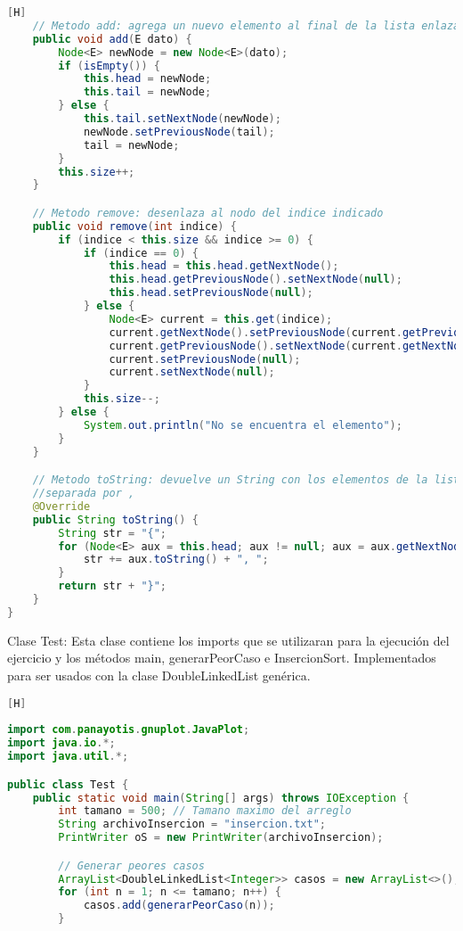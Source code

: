 \begin{enumerate}[{Ejercicio} 1.]
\begin{lstlisting}[language=java, caption={DoubleLinkedList}][H]
    // Metodo add: agrega un nuevo elemento al final de la lista enlazada
    public void add(E dato) {
        Node<E> newNode = new Node<E>(dato);
        if (isEmpty()) {
            this.head = newNode;
            this.tail = newNode;
        } else {
            this.tail.setNextNode(newNode);
            newNode.setPreviousNode(tail);
            tail = newNode;
        }
        this.size++;
    }

    // Metodo remove: desenlaza al nodo del indice indicado
    public void remove(int indice) {
        if (indice < this.size && indice >= 0) {
            if (indice == 0) {
                this.head = this.head.getNextNode();
                this.head.getPreviousNode().setNextNode(null);
                this.head.setPreviousNode(null);
            } else {
                Node<E> current = this.get(indice);
                current.getNextNode().setPreviousNode(current.getPreviousNode());
                current.getPreviousNode().setNextNode(current.getNextNode());
                current.setPreviousNode(null);
                current.setNextNode(null);
            }
            this.size--;
        } else {
            System.out.println("No se encuentra el elemento");
        }
    }

    // Metodo toString: devuelve un String con los elementos de la lista enlazada 
    //separada por ,
    @Override
    public String toString() {
        String str = "{";
        for (Node<E> aux = this.head; aux != null; aux = aux.getNextNode()) {
            str += aux.toString() + ", ";
        }
        return str + "}";
    }
}
	\end{lstlisting}
	Clase Test: Esta clase contiene los imports que se utilizaran para la ejecución del ejercicio y los métodos main, generarPeorCaso e InsercionSort. Implementados para ser usados con la clase DoubleLinkedList genérica.
	\begin{lstlisting}[language=java, caption={Test}][H]
		
import com.panayotis.gnuplot.JavaPlot;
import java.io.*;
import java.util.*;

public class Test {
    public static void main(String[] args) throws IOException {
        int tamano = 500; // Tamano maximo del arreglo
        String archivoInsercion = "insercion.txt";
        PrintWriter oS = new PrintWriter(archivoInsercion);

        // Generar peores casos
        ArrayList<DoubleLinkedList<Integer>> casos = new ArrayList<>();
        for (int n = 1; n <= tamano; n++) {
            casos.add(generarPeorCaso(n));
        }


\end{lstlisting}
\end{enumerate}
